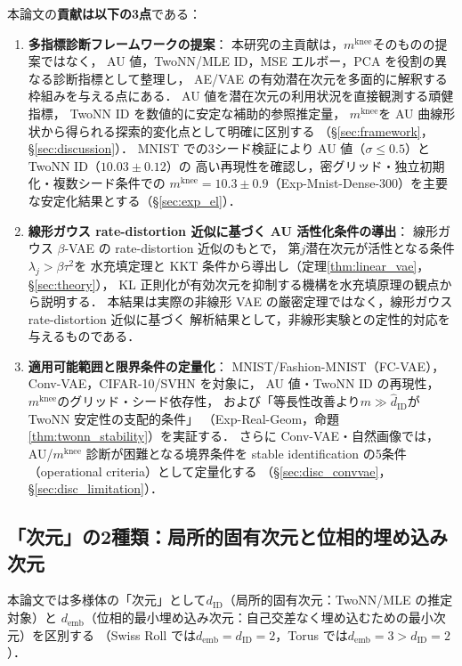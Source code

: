 \documentclass[11pt,a4paper]{jsarticle}
\newcommand{\dID}{d_{\mathrm{ID}}}
\newcommand{\mknee}{m^{\mathrm{knee}}}
\newcommand{\demb}{d_{\mathrm{emb}}}
\begin{document}
本論文の\textbf{貢献は以下の3点}である：
\begin{enumerate}
  \item \textbf{多指標診断フレームワークの提案}：
        本研究の主貢献は，$\mknee$そのものの提案ではなく，
        AU 値，TwoNN/MLE ID，MSE エルボー，PCA を役割の異なる診断指標として整理し，
        AE/VAE の有効潜在次元を多面的に解釈する枠組みを与える点にある．
        AU 値を潜在次元の利用状況を直接観測する頑健指標，
        TwoNN ID を数値的に安定な補助的参照推定量，
        $\mknee$を AU 曲線形状から得られる探索的変化点として明確に区別する
        （§\ref{sec:framework}，§\ref{sec:discussion}）．
        MNIST での3シード検証により AU 値（$\sigma \leq 0.5$）と TwoNN ID（$10.03 \pm 0.12$）の
        高い再現性を確認し，密グリッド・独立初期化・複数シード条件での
        $\mknee = 10.3 \pm 0.9$（Exp-Mnist-Dense-300）を主要な安定化結果とする（§\ref{sec:exp_el}）．
  \item \textbf{線形ガウス rate-distortion 近似に基づく AU 活性化条件の導出}：
        線形ガウス $\beta$-VAE の rate-distortion 近似のもとで，
        第$j$潜在次元が活性となる条件$\lambda_j > \beta\tau^2$を
        水充填定理と KKT 条件から導出し（定理\ref{thm:linear_vae}，§\ref{sec:theory}），
        KL 正則化が有効次元を抑制する機構を水充填原理の観点から説明する．
        本結果は実際の非線形 VAE の厳密定理ではなく，線形ガウス rate-distortion 近似に基づく
        解析結果として，非線形実験との定性的対応を与えるものである．
  \item \textbf{適用可能範囲と限界条件の定量化}：
        MNIST/Fashion-MNIST（FC-VAE），Conv-VAE，CIFAR-10/SVHN を対象に，
        AU 値・TwoNN ID の再現性，$\mknee$のグリッド・シード依存性，
        および「等長性改善より$m \gg \hat{d}_\mathrm{ID}$が TwoNN 安定性の支配的条件」
        （Exp-Real-Geom，命題\ref{thm:twonn_stability}）を実証する．
        さらに Conv-VAE・自然画像では，AU/$\mknee$ 診断が困難となる境界条件を
        stable identification の5条件（operational criteria）として定量化する
        （§\ref{sec:disc_convvae}，§\ref{sec:disc_limitation}）．
\end{enumerate}

\subsection{「次元」の2種類：局所的固有次元と位相的埋め込み次元}\label{sec:intro_dim}

本論文では多様体の「次元」として$\dID$（局所的固有次元：TwoNN/MLE の推定対象）と
$\demb$（位相的最小埋め込み次元：自己交差なく埋め込むための最小次元）を区別する
（Swiss Roll では$\demb = \dID = 2$，Torus では$\demb = 3 > \dID = 2$）．
\end{document}
